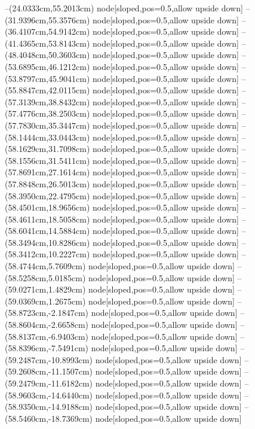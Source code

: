 --(24.0333cm,55.2013cm) node[sloped,pos=0.5,allow upside down]{\ArrowIn}
--(31.9396cm,55.3576cm) node[sloped,pos=0.5,allow upside down]{\ArrowIn}
--(36.4107cm,54.9142cm) node[sloped,pos=0.5,allow upside down]{\ArrowIn}
--(41.4365cm,53.8143cm) node[sloped,pos=0.5,allow upside down]{\ArrowIn}
--(48.4048cm,50.3603cm) node[sloped,pos=0.5,allow upside down]{\ArrowIn}
--(53.6895cm,46.1212cm) node[sloped,pos=0.5,allow upside down]{\ArrowIn}
--(53.8797cm,45.9041cm) node[sloped,pos=0.5,allow upside down]{\arrowIn}
--(55.8847cm,42.0115cm) node[sloped,pos=0.5,allow upside down]{\ArrowIn}
--(57.3139cm,38.8432cm) node[sloped,pos=0.5,allow upside down]{\ArrowIn}
--(57.4776cm,38.2503cm) node[sloped,pos=0.5,allow upside down]{\arrowIn}
--(57.7830cm,35.3447cm) node[sloped,pos=0.5,allow upside down]{\ArrowIn}
--(58.1444cm,33.0443cm) node[sloped,pos=0.5,allow upside down]{\ArrowIn}
--(58.1629cm,31.7098cm) node[sloped,pos=0.5,allow upside down]{\ArrowIn}
--(58.1556cm,31.5411cm) node[sloped,pos=0.5,allow upside down]{\arrowIn}
--(57.8691cm,27.1614cm) node[sloped,pos=0.5,allow upside down]{\ArrowIn}
--(57.8848cm,26.5013cm) node[sloped,pos=0.5,allow upside down]{\arrowIn}
--(58.3950cm,22.4795cm) node[sloped,pos=0.5,allow upside down]{\ArrowIn}
--(58.4501cm,18.9656cm) node[sloped,pos=0.5,allow upside down]{\ArrowIn}
--(58.4611cm,18.5058cm) node[sloped,pos=0.5,allow upside down]{\arrowIn}
--(58.6041cm,14.5884cm) node[sloped,pos=0.5,allow upside down]{\ArrowIn}
--(58.3494cm,10.8286cm) node[sloped,pos=0.5,allow upside down]{\ArrowIn}
--(58.3412cm,10.2227cm) node[sloped,pos=0.5,allow upside down]{\arrowIn}
--(58.4744cm,5.7609cm) node[sloped,pos=0.5,allow upside down]{\ArrowIn}
--(58.5258cm,5.0185cm) node[sloped,pos=0.5,allow upside down]{\arrowIn}
--(59.0271cm,1.4829cm) node[sloped,pos=0.5,allow upside down]{\ArrowIn}
--(59.0369cm,1.2675cm) node[sloped,pos=0.5,allow upside down]{\arrowIn}
--(58.8723cm,-2.1847cm) node[sloped,pos=0.5,allow upside down]{\ArrowIn}
--(58.8604cm,-2.6658cm) node[sloped,pos=0.5,allow upside down]{\arrowIn}
--(58.8137cm,-6.9403cm) node[sloped,pos=0.5,allow upside down]{\ArrowIn}
--(58.8396cm,-7.5491cm) node[sloped,pos=0.5,allow upside down]{\arrowIn}
--(59.2487cm,-10.8993cm) node[sloped,pos=0.5,allow upside down]{\ArrowIn}
--(59.2608cm,-11.1507cm) node[sloped,pos=0.5,allow upside down]{\arrowIn}
--(59.2479cm,-11.6182cm) node[sloped,pos=0.5,allow upside down]{\arrowIn}
--(58.9603cm,-14.6440cm) node[sloped,pos=0.5,allow upside down]{\ArrowIn}
--(58.9350cm,-14.9188cm) node[sloped,pos=0.5,allow upside down]{\arrowIn}
--(58.5460cm,-18.7369cm) node[sloped,pos=0.5,allow upside down]{\ArrowIn}
